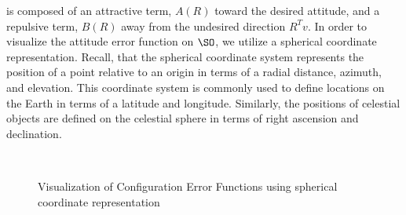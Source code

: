 is composed of an attractive term, \( A (R) \) toward the desired attitude, and a repulsive term, \( B(R) \) away from the undesired direction \( R^T v \).
In order to visualize the attitude error function on \( \SO \), we utilize a spherical coordinate representation.
Recall, that the spherical coordinate system represents the position of a point relative to an origin in terms of a radial distance, azimuth, and elevation.
This coordinate system is commonly used to define locations on the Earth in terms of a latitude and longitude.
Similarly, the positions of celestial objects are defined on the celestial sphere in terms of right ascension and declination. 
\begin{figure}[H]%
    \centering 
    ~
    ~
    \caption{Visualization of Configuration Error Functions using spherical coordinate representation}
    \label{fig:config_error} 
\end{figure}%

